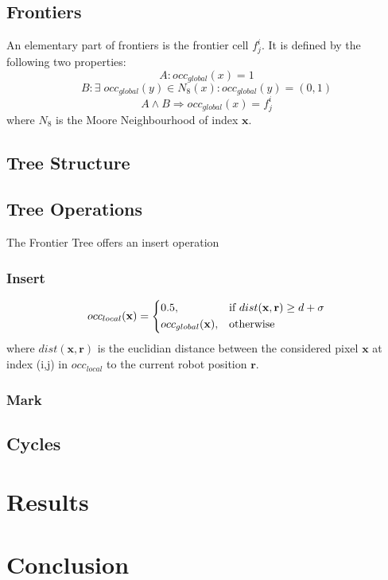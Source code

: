 \documentclass[twocolumn]{svjour3}[2016]
\begin{document}
\subsection{Frontiers}
\label{frontiers}
An elementary part of frontiers is the frontier cell $f^i_j$. It is defined by the following two properties:
\begin{equation}
A:occ_{global}(x) = 1
\end{equation}
\begin{equation}
B:\exists\; occ_{global}(y)\in N_8(x):occ_{global}(y)=(0,1)
\end{equation}
\begin{equation}
A\land B\Rightarrow occ_{global}(x) = f^i_j
\end{equation}
where $N_8$ is the Moore Neighbourhood of index $\textbf{x}$. 

\subsection{Tree Structure}

\subsection{Tree Operations}

The Frontier Tree offers an insert operation 

\subsubsection{Insert}
\begin{equation}
occ_ {local}(\textbf{x})=
\begin{dcases}
0.5, & \text{if } dist(\textbf{x}, \textbf{r}) \geq d + \sigma \\
occ_{global}(\textbf{x}), & \text{otherwise}
\end{dcases}
\end{equation}
where $dist(\textbf{x}, \textbf{r})$ is the euclidian distance between the considered pixel $\textbf{x}$ at index (i,j) in $occ_{local}$ to the current robot position $\textbf{r}$.

\subsubsection{Mark}

\subsection{Cycles}

\section{Results}

\section{Conclusion}



\end{document}

